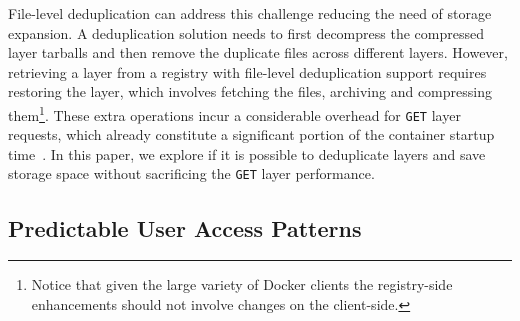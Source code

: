 File-level deduplication can address this challenge reducing the need of storage expansion.
%
A deduplication solution needs to first decompress
the compressed layer tarballs and then remove the duplicate files across
different layers.
%
%
However, retrieving a layer from a registry with file-level
deduplication support requires restoring the layer,
which involves fetching the files, archiving and compressing them\footnote{Notice
that given the large variety of Docker clients the registry-side enhancements
should not involve changes on the client-side.}.
%
These extra operations incur a considerable overhead for
\texttt{GET} layer requests, which already constitute a significant portion of
the container startup time~\cite{slacker}.
%
In this paper, we explore if it is possible to deduplicate layers and save storage space
without sacrificing the \texttt{GET} layer performance.
%   


\subsection{Predictable User Access Patterns}
\label{sec:predictable-user-access}


